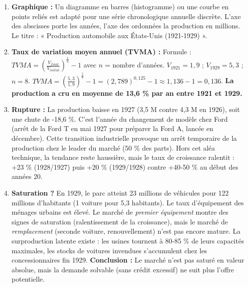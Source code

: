\documentclass[11pt]{article}
\begin{document}
\begin{exoresolu}
\begin{enumerate}
    \item \textbf{Graphique :} Un diagramme en barres (histogramme) ou une courbe en points reliés est adapté pour une série chronologique annuelle discrète. L'axe des abscisses porte les années, l'axe des ordonnées la production en millions. Le titre : « Production automobile aux États-Unis (1921-1929) ».
    \item \textbf{Taux de variation moyen annuel (TVMA) :}
    Formule : $TVMA = \left( \frac{V_{final}}{V_{initial}} \right)^{\frac{1}{n}} - 1$ avec $n$ = nombre d'années.
    $V_{1921} = 1{,}9$ ; $V_{1929} = 5{,}3$ ; $n = 8$.
    $TVMA = \left( \frac{5{,}3}{1{,}9} \right)^{\frac{1}{8}} - 1 = (2{,}789)^{0,125} - 1 \approx 1{,}136 - 1 = 0{,}136$.
    \textbf{La production a cru en moyenne de 13,6 \% par an entre 1921 et 1929.}
    \item \textbf{Rupture :} La production baisse en 1927 (3,5 M contre 4,3 M en 1926), soit une chute de -18,6 \%. C'est l'année du changement de modèle chez Ford (arrêt de la Ford T en mai 1927 pour préparer la Ford A, lancée en décembre). Cette transition industrielle provoque un arrêt temporaire de la production chez le leader du marché (50 \% des parts). Hors cet aléa technique, la tendance reste haussière, mais le taux de croissance ralentit : +23 \% (1928/1927) puis +20 \% (1929/1928) contre +40-50 \% au début des années 20.
    \item \textbf{Saturation ?} En 1929, le parc atteint 23 millions de véhicules pour 122 millions d'habitants (1 voiture pour 5,3 habitants). Le taux d'équipement des ménages urbains est élevé. Le marché de \emph{premier équipement} montre des signes de saturation (ralentissement de la croissance), mais le marché de \emph{remplacement} (seconde voiture, renouvellement) n'est pas encore mature. La surproduction latente existe : les usines tournent à 80-85 \% de leurs capacités maximales, les stocks de voitures invendues s'accumulent chez les concessionnaires fin 1929. \textbf{Conclusion :} Le marché n'est pas saturé en valeur absolue, mais la demande solvable (sans crédit excessif) ne suit plus l'offre potentielle.
\end{enumerate}
\end{exoresolu}
\end{document}

